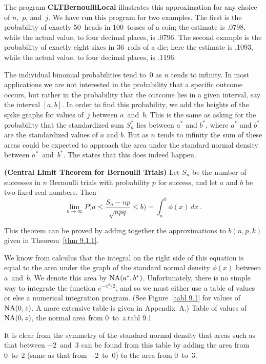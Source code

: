 The program {\bf CLTBernoulliLocal} illustrates this
approximation for any choice of $n$,~$p$, and~$j$.  We have run this program for two
examples.  The first is the probability of exactly 50~heads in 100~tosses of a coin;
the estimate is .0798, while the actual value, to four decimal places, is .0796.  The second
example is the probability of exactly eight sixes in 36~rolls of a die; here the estimate is
.1093, while the actual value, to four decimal places, is .1196.
\par
The individual binomial probabilities tend to~0 as $n$ tends to infinity.  In
most applications we are not interested in the probability that a specific
outcome occurs, but rather in the probability that the outcome lies in a given
interval, say the interval $[a, b]$.  In order to find this probability, we add the
heights of the spike graphs for values of~$j$ between $a$~and~$b$.  This is the same
as asking for the probability that the standardized sum $S_n^*$ lies between $a^*$ and 
$b^*$, where $a^*$ and $b^*$ are the standardized values of $a$ and $b$.  But as $n$
tends to infinity the sum of these areas could be expected to approach the area
under the standard normal density between $a^*$~and~$b^*$.  The 
states that this does indeed happen.

\begin{theorem}{\bf (Central Limit Theorem for Bernoulli Trials)} 
Let $S_n$ be the number of successes in $n$ Bernoulli trials with probability $p$ for success, and let
$a$ and $b$ be two fixed real numbers.  Then
$$\lim_{n \rightarrow \infty} P\biggl(a \le \frac{S_n - np}{\sqrt{npq}} \le b\biggr) = \int_a^b \phi(x)\,dx\ .$$
\end{theorem}

This theorem can be proved by adding together the approximations to $b(n,p,k)$ given in 
Theorem~\ref{thm 9.1.1}.
\par
We know from calculus that the integral on the right side of this equation is
equal to the area under the graph of the standard normal density $\phi(x)$ between
$a$~and~$b$.  We denote this area by ${\rm NA}(a^*, b^*)$.  Unfortunately, there is no simple way to
integrate the function
$e^{-x^2/2}$, and so we must either use a table of values or else a numerical
integration program.  (See Figure~\ref{tabl 9.1} for values of ${\rm NA}(0, z)$.  A more extensive 
table is given in Appendix~A.)
{Table of values of ${\rm NA}(0,z)$, the normal area from 0~to~$z$.}{tabl 9.1}
\par
It is clear from the symmetry of the standard normal density that areas such as that
between $-2$~and~3 can be found from this table by adding the area from 0~to~2
(same as that from $-2$~to~0) to the area from 0~to~3.
\par

